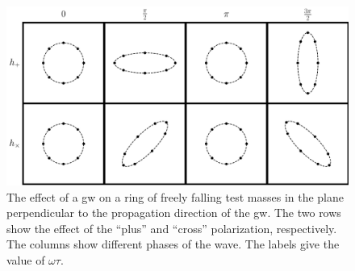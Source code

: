 \begin{figure}
	\centering
	\includegraphics[width=\textwidth]{chapters/foundations/sections/gw/images/effect_gw.pdf}
	\caption[Effect of a gravitational wave on a ring of test-masses]{The effect of a \acrshort{gw} on a ring of freely falling test masses in the plane perpendicular to the propagation direction of the \acrshort{gw}. The two rows show the effect of the ``plus'' and ``cross'' polarization, respectively. The columns show different phases of the wave. The labels give the value of $\omega\tau$.}\label{fig:effect_gw}
\end{figure}

